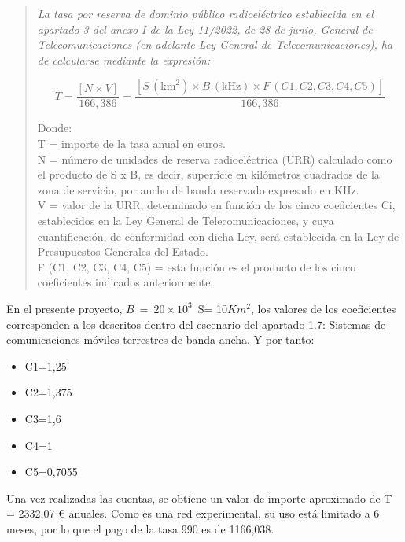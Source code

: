 \begin{quote}
\itshape
La tasa por reserva de dominio público radioeléctrico establecida en el apartado 3 del anexo I de la Ley 11/2022, de 28 de junio, General de Telecomunicaciones (en adelante Ley General de Telecomunicaciones), ha de calcularse mediante la expresión:

$$T = \frac{[N \times V]}{166,386} = \frac{[S \, (\text{km}^2) \times B \, (\text{kHz}) \times F \, (C1, C2, C3, C4, C5)]}{166,386}$$

Donde:\\
T = importe de la tasa anual en euros.\\
N = número de unidades de reserva radioeléctrica (URR) calculado como el producto de S x B, es decir, superficie en kilómetros cuadrados de la zona de servicio, por ancho de banda reservado expresado en KHz.\\
V = valor de la URR, determinado en función de los cinco coeficientes Ci, establecidos en la Ley General de Telecomunicaciones, y cuya cuantificación, de conformidad con dicha Ley, será establecida en la Ley de Presupuestos Generales del Estado.\\
F (C1, C2, C3, C4, C5) = esta función es el producto de los cinco coeficientes indicados anteriormente.
\end{quote}

En el presente proyecto, $B\ =\ 20 \times 10^3$\, S= 10$Km^2$, los valores de los coeficientes corresponden a los descritos dentro del escenario del apartado 1.7: Sistemas de comunicaciones móviles terrestres de banda ancha. Y por tanto: 
\begin{itemize}
\item C1=1,25
\item C2=1,375
\item C3=1,6
\item C4=1
\item C5=0,7055
\end{itemize}

Una vez realizadas las cuentas, se obtiene un valor de importe aproximado de T = 2332,07 \euro{} anuales. Como es una red experimental, su uso está limitado a 6 meses, por lo que el pago de la tasa 990 es de 1166,038. \\
